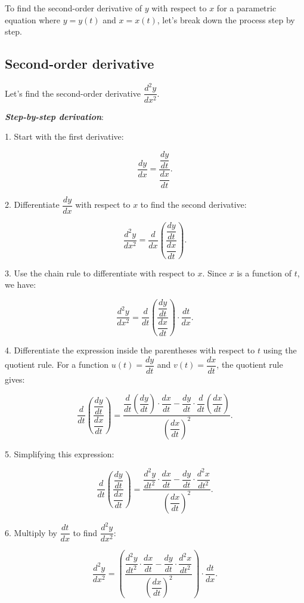 \documentclass[a4paper,12pt]{book}
\begin{document}
To find the second-order derivative of \( y \) with respect to \( x \) for a parametric equation where \( y = y(t) \) and \( x = x(t) \), let's break down the process step by step.

\subsection{Second-order derivative}

Let's find the second-order derivative \( \dfrac{d^2y}{dx^2} \).

\textit{\textbf{Step-by-step derivation}}:

1. Start with the first derivative:

   \[
   \dfrac{dy}{dx} = \dfrac{\dfrac{dy}{dt}}{\dfrac{dx}{dt}}.
   \]

2. Differentiate \( \dfrac{dy}{dx} \) with respect to \( x \) to find the second derivative:

   \[
   \dfrac{d^2y}{dx^2} = \dfrac{d}{dx} \left( \dfrac{\dfrac{dy}{dt}}{\dfrac{dx}{dt}} \right).
   \]

3. Use the chain rule to differentiate with respect to \( x \). Since \( x \) is a function of \( t \), we have:

   \[
   \dfrac{d^2y}{dx^2} = \dfrac{d}{dt} \left( \dfrac{\dfrac{dy}{dt}}{\dfrac{dx}{dt}} \right) \cdot \dfrac{dt}{dx}.
   \]

4. Differentiate the expression inside the parentheses with respect to \( t \) using the quotient rule. For a function \( u(t) = \dfrac{dy}{dt} \) and \( v(t) = \dfrac{dx}{dt} \), the quotient rule gives:

   \[
   \dfrac{d}{dt} \left( \dfrac{\dfrac{dy}{dt}}{\dfrac{dx}{dt}} \right) = \dfrac{\dfrac{d}{dt} \left( \dfrac{dy}{dt} \right) \cdot \dfrac{dx}{dt} - \dfrac{dy}{dt} \cdot \dfrac{d}{dt} \left( \dfrac{dx}{dt} \right)}{\left( \dfrac{dx}{dt} \right)^2}.
   \]

5. Simplifying this expression:

   \[
   \dfrac{d}{dt} \left( \dfrac{\dfrac{dy}{dt}}{\dfrac{dx}{dt}} \right) = \dfrac{\dfrac{d^2y}{dt^2} \cdot \dfrac{dx}{dt} - \dfrac{dy}{dt} \cdot \dfrac{d^2x}{dt^2}}{\left( \dfrac{dx}{dt} \right)^2}.
   \]

6. Multiply by \( \dfrac{dt}{dx} \) to find \( \dfrac{d^2y}{dx^2} \):

   \[
   \dfrac{d^2y}{dx^2} = \left( \dfrac{\dfrac{d^2y}{dt^2} \cdot \dfrac{dx}{dt} - \dfrac{dy}{dt} \cdot \dfrac{d^2x}{dt^2}}{\left( \dfrac{dx}{dt} \right)^2} \right) \cdot \dfrac{dt}{dx}.
   \]
\end{document}

